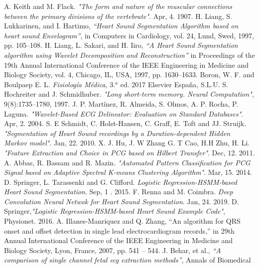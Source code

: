 \begin{thebibliography}{9}
  A. Keith and M. Flack. \textit{"The form and nature of the muscular connections between the primary divisions of the
  vertebrate"}. Apr, 4. 1907.
  H. Liang, S. Lukkarinen, and I. Hartimo, \textit{“Heart Sound Segmentation Algorithm based on heart sound
  Envelogram”}, in Computers in Cardiology, vol. 24, Lund, Swed, 1997, pp. 105–108.
  H. Liang, L. Sakari, and H. Iiro, \textit{“A Heart Sound Segmentation algorithm using Wavelet Decomposition and
  Reconstruction”} in Proceedings of the 19th Annual International Conference of the IEEE Engineering in Medicine and
  Biology Society, vol. 4, Chicago, IL, USA, 1997, pp. 1630–1633.
  Boron, W. F. and Boulpaep E. L. \textit{Fisiología Médica}, 3.$^a$ ed. 2017 Elsevier España, S.L.U.
  S. Hochreiter and J. Schmidhuber. \textit{"Long short-term memory. Neural Computation"}, 9(8):1735–1780, 1997.
  J. P. Martínez, R. Almeida, S. Olmos, A. P. Rocha, P. Laguna. \textit{"Wavelet-Based ECG Delineator: Evaluation on
  Standard Databases"}. Apr, 2. 2004.
  S. E Schmidt, C. Holst-Hansen, C. Graff, E. Toft and JJ. Struijk. \textit{"Segmentation of Heart Sound recordings by
  a Duration-dependent Hidden Markov model"}. Jan, 22. 2010.
  X. J.  Hu,  J. W Zhang  G. T Cao,  H.H Zhu,  H. Li. \textit{"Feature Extraction and Choice in PCG based on Hilbert
  Transfer"}. Dec, 12. 2011.
  A. Abbas, R. Bassam and R. Mazin. \textit{"Automated Pattern Classification for PCG Signal based on Adaptive
  Spectral K-means Clustering Algorithm"}. Mar, 15. 2014.
  D. Springer, L. Tarassenki and G. Clifford. \textit{Logistic Regression-HSMM-based Heart Sound Segmentation}. Sep, 1
  . 2015.
  F. Renna and M. Coimbra. \textit{Deep Convolution Neural Netwok for Heart Sound Segmentation}. Jan, 24. 2019.
  D. Springer,\textit{"Logistic Regression-HSMM-based Heart Sound Example Code"}, Physionet. 2016.
  A. Illanes-Manriquez and Q. Zhang, “An algorithm for QRS onset and
  offset detection in single lead electrocardiogram records,” in 29th Annual International Conference of the IEEE
  Engineering in Medicine and Biology Society, Lyon, France, 2007, pp. 541 – 544.
  J. Behar, et al., \textit{“A comparison of single channel fetal ecg extraction methods”}, Annals of Biomedical

\end{thebibliography}
